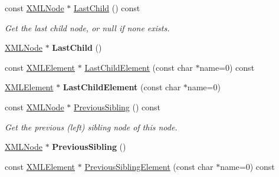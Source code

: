 \begin{DoxyCompactItemize}
\item 
const \hyperlink{classtinyxml2_1_1XMLNode}{X\+M\+L\+Node} $\ast$ \hyperlink{classtinyxml2_1_1XMLNode_a6088246532b02895beb0e6fa561a7f3b}{Last\+Child} () const \hypertarget{classtinyxml2_1_1XMLNode_a6088246532b02895beb0e6fa561a7f3b}{}\label{classtinyxml2_1_1XMLNode_a6088246532b02895beb0e6fa561a7f3b}

\begin{DoxyCompactList}\small\item\em Get the last child node, or null if none exists. \end{DoxyCompactList}\item 
\hyperlink{classtinyxml2_1_1XMLNode}{X\+M\+L\+Node} $\ast$ {\bfseries Last\+Child} ()\hypertarget{classtinyxml2_1_1XMLNode_ad7552c8cb1dc0cb6f3bdc14a9d115dbf}{}\label{classtinyxml2_1_1XMLNode_ad7552c8cb1dc0cb6f3bdc14a9d115dbf}

\item 
const \hyperlink{classtinyxml2_1_1XMLElement}{X\+M\+L\+Element} $\ast$ \hyperlink{classtinyxml2_1_1XMLNode_a91a59df4ae1b4eb7f573c0a4cfc81bee}{Last\+Child\+Element} (const char $\ast$name=0) const 
\item 
\hyperlink{classtinyxml2_1_1XMLElement}{X\+M\+L\+Element} $\ast$ {\bfseries Last\+Child\+Element} (const char $\ast$name=0)\hypertarget{classtinyxml2_1_1XMLNode_a1b77a8194d059665a4412ebfea276878}{}\label{classtinyxml2_1_1XMLNode_a1b77a8194d059665a4412ebfea276878}

\item 
const \hyperlink{classtinyxml2_1_1XMLNode}{X\+M\+L\+Node} $\ast$ \hyperlink{classtinyxml2_1_1XMLNode_a4cb1bf63e9de55129d21a7be60685fd4}{Previous\+Sibling} () const \hypertarget{classtinyxml2_1_1XMLNode_a4cb1bf63e9de55129d21a7be60685fd4}{}\label{classtinyxml2_1_1XMLNode_a4cb1bf63e9de55129d21a7be60685fd4}

\begin{DoxyCompactList}\small\item\em Get the previous (left) sibling node of this node. \end{DoxyCompactList}\item 
\hyperlink{classtinyxml2_1_1XMLNode}{X\+M\+L\+Node} $\ast$ {\bfseries Previous\+Sibling} ()\hypertarget{classtinyxml2_1_1XMLNode_ae760e5e7e766df1d2cf3bb4a847876d6}{}\label{classtinyxml2_1_1XMLNode_ae760e5e7e766df1d2cf3bb4a847876d6}

\item 
const \hyperlink{classtinyxml2_1_1XMLElement}{X\+M\+L\+Element} $\ast$ \hyperlink{classtinyxml2_1_1XMLNode_aae864cedca1b711cf0e357fd6504a6d8}{Previous\+Sibling\+Element} (const char $\ast$name=0) const \hypertarget{classtinyxml2_1_1XMLNode_aae864cedca1b711cf0e357fd6504a6d8}{}\label{classtinyxml2_1_1XMLNode_aae864cedca1b711cf0e357fd6504a6d8}


\end{DoxyCompactItemize}
